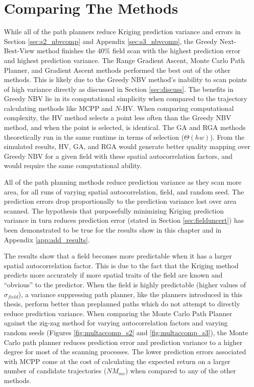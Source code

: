 \section{Comparing The Methods}
While all of the path planners reduce Kriging prediction variance and errors in Section \ref{sec:s2_nbvcomp} and Appendix \ref{sec:s3_nbvcomp}, the Greedy Next-Best-View method finishes the $40\%$ field scan with the highest prediction error and highest prediction variance. The Range Gradient Ascent, Monte Carlo Path Planner, and Gradient Ascent methods performed the best out of the other methods. This is likely due to the Greedy NBV method's inability to scan points of high variance directly as discussed in Section \ref{sec:discuss}. The benefits in Greedy NBV lie in its computational simplicity when compared to the trajectory calculating methods like MCPP and $N$-HV. When comparing computational complexity, the HV method selects a point less often than the Greedy NBV method, and when the point is selected, is identical. The GA and RGA methods theoretically run in the same runtime in terms of selection ($\Theta(hw)$). From the simulated results, HV, GA, and RGA would generate better quality mapping over Greedy NBV for a given field with these spatial autocorrelation factors, and would require the same computational ability. 

All of the path planning methods reduce prediction variance as they scan more area, for all runs of varying spatial autocorrelation, field, and random seed. The prediction errors drop proportionally to the prediction variance lost over area scanned. The hypothesis that purposefully minimizing Kriging prediction variance in turn reduces prediction error (stated in Section \ref{sec:fielduncert}) has been demonstrated to be true for the results show in this chapter and in Appendix \ref{app:add_results}. 

The results show that a field becomes more predictable when it has a larger spatial autocorrelation factor. This is due to the fact that the Kriging method predicts more accurately if more spatial traits of the field are known and ``obvious'' to the predictor. When the field is highly predictable (higher values of $\sigma_{field}$), a variance suppressing path planner, like the planners introduced in this thesis, perform better than preplanned paths which do not attempt to directly reduce prediction variance. When comparing the Monte Carlo Path Planner against the zig-zag method for varying autocorrelation factors and varying random seeds (Figures \ref{fig:multaccomp_s2} and \ref{fig:multaccomp_s3}), the Monte Carlo path planner reduces prediction error and prediction variance to a higher degree for most of the scanning processes. The lower prediction errors associated with MCPP come at the cost of calculating the expected return on a larger number of candidate trajectories ($NM_{mc}$) when compared to any of the other methods. 

